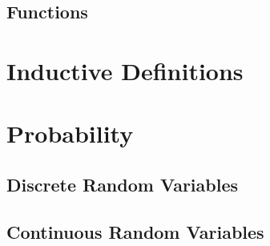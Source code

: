 \documentclass{article}
\begin{document}
	\subsection{Functions}
	
	\section{Inductive Definitions}
	
	\section{Probability}
	\subsection{Discrete Random Variables}
	\subsection{Continuous Random Variables}
	
	
\end{document}

